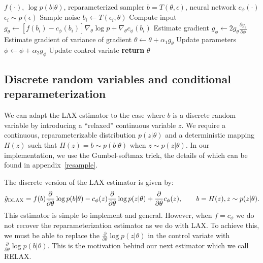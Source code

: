 \documentclass{article}
\newcommand{\PT}{\frac{\partial}{\partial \theta}}
\newcommand{\LAX}{{\textnormal{LAX}}}
\newcommand{\DLAX}{{\textnormal{DLAX}}}
\begin{document}
\begin{algorithm}[h]
\begin{algorithmic}
\Require $f(\cdot)$, $\log p(b|\theta)$, reparameterized sampler $b = T(\theta, \epsilon)$, neural network $c_\phi(\cdot)$
	\State $\epsilon_{i} \sim p(\epsilon)$ \Comment Sample noise
	\State $b_i \leftarrow T(\epsilon_i, \theta)$ \Comment Compute input
	\State  $g_\theta \leftarrow \left[f(b_i) - c_{\phi}(b_i) \right] \nabla_\theta \log p + \nabla_\theta c_\phi(b_i)$ \Comment Estimate gradient
	\State  $g_\phi \leftarrow 2 g_\theta \frac{\partial g_\theta}{\partial \phi}$ \Comment Estimate gradient of variance of gradient
	\State $\theta \leftarrow \theta + \alpha_1 g_\theta$ \Comment Update parameters
	\State $\phi \leftarrow \phi + \alpha_2 g_\phi$ \Comment Update control variate
\EndWhile
\State \textbf{return} $\theta$ 
\end{algorithmic}
\caption{\LAX{}: Optimizing parameters and a gradient control variate simultaneously.}
\label{lax}
\end{algorithm}

\subsection{Discrete random variables and conditional reparameterization}
We can adapt the \LAX{} estimator to the case where $b$ is a discrete random variable by introducing a ``relaxed'' continuous variable $z$.
We require a continuous, reparameterizable distribution $p(z|\theta)$ and a deterministic mapping $H(z)$ such that $H(z) = b \sim p(b|\theta)$ when $z \sim p(z|\theta)$.
In our implementation, we use the Gumbel-softmax trick, the details of which can be found in appendix~\ref{resample}.

The discrete version of the \LAX{} estimator is given by:
%
\begin{align}
\label{eq:discrete lax}
\hat g_\DLAX = f(b) \PT \log p(b|\theta) - c_\phi(z) \PT \log p(z|\theta) + \PT c_\phi(z), \qquad b = H(z), z \sim p(z|\theta).
\end{align}
%
This estimator is simple to implement and general.
However, when $f = c_\phi$ we do not recover the reparameterization estimator as we do with LAX. To achieve this, we must be able  to replace the $\PT \log p(z|\theta)$ in the control variate with $\PT \log p(b|\theta)$. This is the motivation behind our next estimator which we call RELAX.
\end{document}
